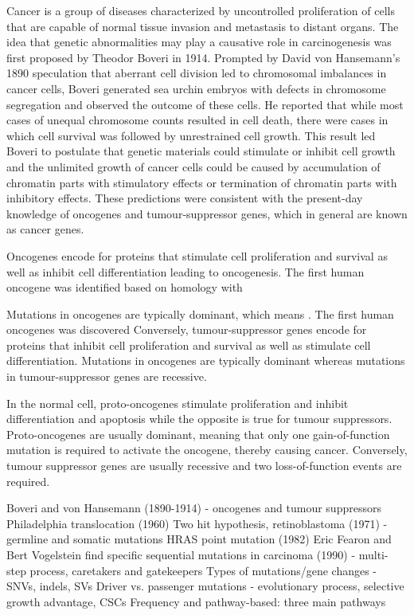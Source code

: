 Cancer is a group of diseases characterized by uncontrolled proliferation of cells that are capable of normal tissue invasion and metastasis to distant organs. The idea that genetic abnormalities may play a causative role in carcinogenesis was first proposed by Theodor Boveri in 1914. Prompted by David von Hansemann's 1890 speculation that aberrant cell division led to chromosomal imbalances in cancer cells, Boveri generated sea urchin embryos with defects in chromosome segregation and observed the outcome of these cells. He reported that while most cases of unequal chromosome counts resulted in cell death, there were cases in which cell survival was followed by unrestrained cell growth. This result led Boveri to postulate that genetic materials could stimulate or inhibit cell growth and the unlimited growth of cancer cells could be caused by accumulation of chromatin parts with stimulatory effects or termination of chromatin parts with inhibitory effects. These predictions were consistent with the present-day knowledge of oncogenes and tumour-suppressor genes, which in general are known as cancer genes.

Oncogenes encode for proteins that stimulate cell proliferation and survival as well as inhibit cell differentiation leading to oncogenesis. The first human oncogene was identified based on homology with

Mutations in oncogenes are typically dominant, which means . The first human oncogenes was discovered Conversely, tumour-suppressor genes encode for proteins that inhibit cell proliferation and survival as well as stimulate cell differentiation. Mutations in oncogenes are typically dominant whereas mutations in tumour-suppressor genes are recessive.

In the normal cell, proto-oncogenes stimulate proliferation and inhibit differentiation and apoptosis while the opposite is true for tumour suppressors. Proto-oncogenes are usually dominant, meaning that only one gain-of-function mutation is required to activate the oncogene, thereby causing cancer. Conversely, tumour suppressor genes are usually recessive and two loss-of-function events are required.

Boveri and von Hansemann (1890-1914) - oncogenes and tumour suppressors
Philadelphia translocation (1960)
Two hit hypothesis, retinoblastoma (1971) - germline and somatic mutations
HRAS point mutation (1982)
Eric Fearon and Bert Vogelstein find specific sequential mutations in carcinoma (1990) - multi-step process, caretakers and gatekeepers
Types of mutations/gene changes - SNVs, indels, SVs
Driver vs. passenger mutations - evolutionary process, selective growth advantage, CSCs
Frequency and pathway-based: three main pathways

